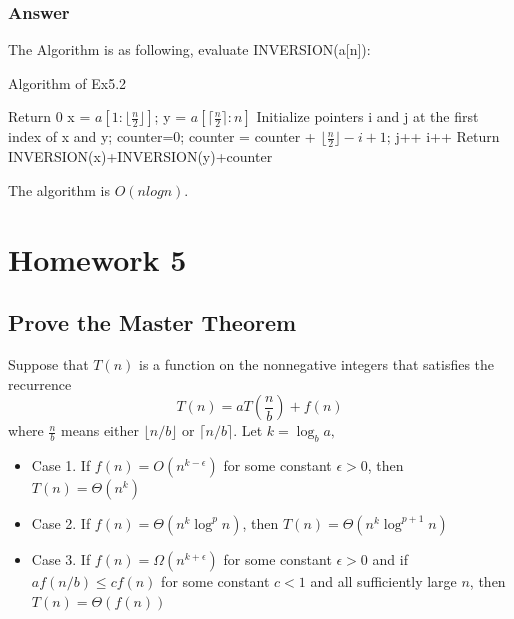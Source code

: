 \documentclass[a4paper]{article}
\begin{document}
\subsubsection*{Answer}
The Algorithm is as following, evaluate INVERSION(a[n]):
\begin{algorithm}[!htb]
	\caption{Algorithm of Ex5.2}
	\begin{algorithmic}[1]
		 Return 0
		\Else
		\State x = $a[1:\lfloor \frac{n}{2} \rfloor]$; y = $a[\lceil \frac{n}{2} \rceil:n]$
		\State Initialize pointers i and j at the first index of x and y; counter=0;
		\State counter = counter + $\lfloor \frac{n}{2} \rfloor - i + 1$; j++
		\Else
		\State i++
		\EndIf
		\EndWhile
		\State Return INVERSION(x)+INVERSION(y)+counter
		\EndIf
		\EndFunction
	\end{algorithmic}
\end{algorithm}
\par The algorithm is $O(n log n)$.


\newpage
\section*{Homework 5}
\subsection*{Prove the Master Theorem}
\begin{adjustwidth}{1cm}{1cm}
	Suppose that $T(n)$ is a function on the nonnegative integers that satisfies the recurrence
	$$
		T(n)=a T\left(\frac{n}{b}\right)+f(n)
	$$
	where $\frac{n}{b}$ means either $\lfloor n / b\rfloor$ or $\lceil n / b\rceil .$ Let $k=\log _{b} a,$
	\begin{itemize}
		\item Case 1. If $f(n)=O\left(n^{k-\epsilon}\right)$ for some constant $\epsilon>0$, then $T(n)=\Theta\left(n^{k}\right)$
		\item Case 2. If $f(n)=\Theta\left(n^{k} \log ^{p} n\right)$, then $T(n)=\Theta\left(n^{k} \log ^{p+1} n\right)$
		\item Case 3. If $f(n)=\Omega\left(n^{k+\epsilon}\right)$ for some constant $\epsilon>0$ and if $a f(n / b) \leq c f(n)$ for some constant $c<1$ and all sufficiently large $n$, then $T(n)=\Theta(f(n))$
	\end{itemize}
\end{adjustwidth}
\end{document}
